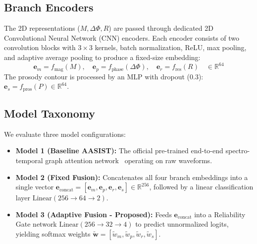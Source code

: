 \documentclass[conference]{IEEEtran}
\begin{document}
\subsection{Branch Encoders}
The 2D representations ($M, \Delta \Phi, R$) are passed through dedicated 2D Convolutional Neural Network (CNN) encoders. Each encoder consists of two convolution blocks with $3 \times 3$ kernels, batch normalization, ReLU, max pooling, and adaptive average pooling to produce a fixed-size embedding:
\begin{equation}
    \mathbf{e}_m = f_{\text{mag}}(M), \quad \mathbf{e}_p = f_{\text{phase}}(\Delta \Phi), \quad \mathbf{e}_r = f_{\text{res}}(R) \quad \in \mathbb{R}^{64}
\end{equation}
The prosody contour is processed by an MLP with dropout (0.3): $\mathbf{e}_s = f_{\text{pros}}(P) \in \mathbb{R}^{64}$.

\subsection{Model Taxonomy}
We evaluate three model configurations:
\begin{itemize}
    \item \textbf{Model 1 (Baseline AASIST):} The official pre-trained end-to-end spectro-temporal graph attention network~\cite{jung2022aasist} operating on raw waveforms.
    \item \textbf{Model 2 (Fixed Fusion):} Concatenates all four branch embeddings into a single vector $\mathbf{e}_{\text{concat}} = [\mathbf{e}_m, \mathbf{e}_p, \mathbf{e}_r, \mathbf{e}_s] \in \mathbb{R}^{256}$, followed by a linear classification layer $\text{Linear}(256 \to 64 \to 2)$.
    \item \textbf{Model 3 (Adaptive Fusion - Proposed):} Feeds $\mathbf{e}_{\text{concat}}$ into a Reliability Gate network $\text{Linear}(256 \to 32 \to 4)$ to predict unnormalized logits, yielding softmax weights $\tilde{\mathbf{w}} = [\tilde{w}_m, \tilde{w}_p, \tilde{w}_r, \tilde{w}_s]$.
\end{itemize}
\end{document}
